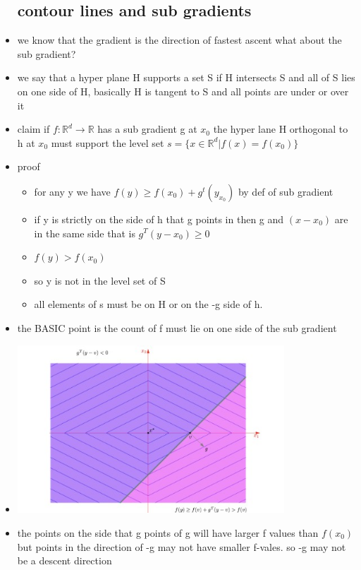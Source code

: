 \documentclass{article}
\begin{document}
\begin{itemize}
\subsection{contour lines and sub gradients}
\item we know that the gradient is the direction of fastest ascent what about the sub gradient?
\item we say that a hyper plane H supports a set S if H intersects S and all of S lies on one side of H, basically H is tangent to S and all points are under or over it 
\item claim if $f:\mathbb{R}^{d}\rightarrow \mathbb{R}$ has a sub gradient g at $x_0$ the hyper lane H orthogonal to h at $x_0$ must support the level set $s=\{x\in \mathbb{R}^{d}|f(x)=f(x_0)\}$
\item proof
\begin{itemize}
    \item for any y we have $f(y)\geq f(x_0)+g^{t}(y_x_0)$ by def of sub gradient 
    \item if y is strictly on the side of h that g points in then g and $(x-x_0)$ are in the same side that is $g^{T}(y-x_0)\geq 0$
    \item $f(y)>f(x_0)$
    \item so y is not in the level set of S
    \item all elements of s must be on H or on the -g side of h.
\end{itemize}
\item the BASIC point is the count of f must lie on one side of the sub gradient 
\item \includegraphics[width=10cm]{lecture_notes/lecture_4/immmages/l4_13.jpg}
\item the points on the side that g points of g will have larger f values than $f(x_0)$ but points in the direction of -g may not have smaller f-vales. so -g may not be a descent direction

\end{itemize}
\end{document}
